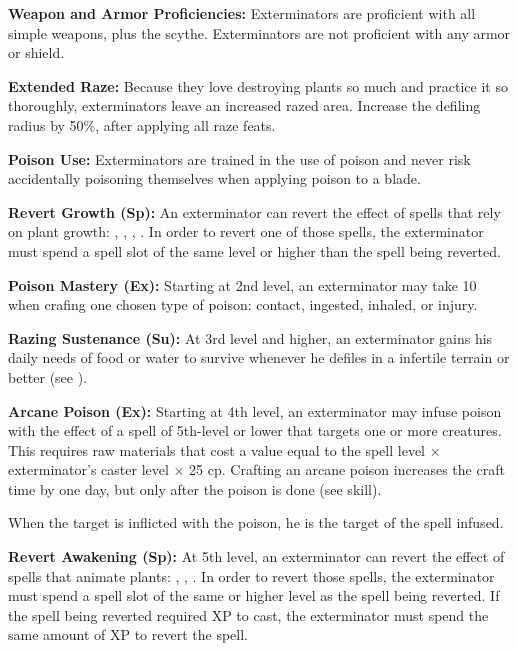{
\textbf{Weapon and Armor Proficiencies:} Exterminators are proficient with all simple  weapons, plus the scythe. Exterminators are not proficient with any armor or shield.

\textbf{Extended Raze:} Because they love destroying plants so much and practice it so thoroughly, exterminators leave an increased razed area. Increase the defiling radius by 50\%, after applying all raze feats.

\textbf{Poison Use:} Exterminators are trained in the use of poison and never risk accidentally poisoning themselves when applying poison to a blade.

\textbf{Revert Growth (Sp):} An exterminator can revert the effect of spells that rely on plant growth: , , , . In order to revert one of those spells, the exterminator must spend a spell slot of the same level or higher than the spell being reverted.

\textbf{Poison Mastery (Ex):} Starting at 2nd level, an exterminator may take 10 when crafing one chosen type of poison: contact, ingested, inhaled, or injury.

\textbf{Razing Sustenance (Su):} At 3rd level and higher, an exterminator gains his daily needs of food or water to survive whenever he defiles in a infertile terrain or better (see ).

\textbf{Arcane Poison (Ex):} Starting at 4th level, an exterminator may infuse poison with the effect of a spell of 5th-level or lower that targets one or more creatures. This requires raw materials that cost a value equal to the spell level $\times$ exterminator's caster level $\times$ 25 cp. Crafting an arcane poison increases the craft time by one day, but only after the poison is done (see  skill).

When the target is inflicted with the poison, he is the target of the spell infused.

\textbf{Revert Awakening (Sp):} At 5th level, an exterminator can revert the effect of spells that animate plants: , , . In order to revert those spells, the exterminator must spend a spell slot of the same or higher level as the spell being reverted. If the spell being reverted required XP to cast, the exterminator must spend the same amount of XP to revert the spell.
}